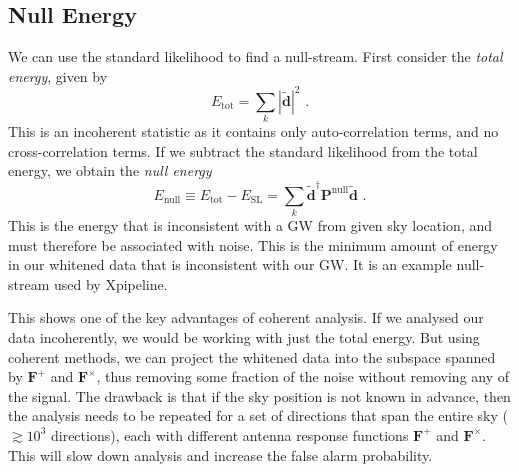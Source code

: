 \documentclass[12pt,twoside,a4paper]{report}
\newcommand{\fs}{\text{ .}}
\newcommand{\tbd}{\tilde{\textbf{d}}}
\begin{document}
\subsection{Null Energy}
We can use the standard likelihood to find a null-stream. First consider the \emph{total energy}, given by
\begin{equation}
E_\text{tot}=\sum_k | \tbd |^2 \fs
\end{equation}
This is an incoherent statistic as it contains only auto-correlation terms, and no cross-correlation terms. If we subtract the standard likelihood from the total energy, we obtain the \emph{null energy}
\begin{equation} \label{Enull}
E_\text{null} \equiv E_\text{tot}-E_\text{SL}=\sum_k \tbd ^\dagger \textbf{P}^\text{null} \tbd \fs
\end{equation}
This is the energy that is inconsistent with a GW from given sky location, and must therefore be associated with noise. This is the minimum amount of energy in our whitened data that is inconsistent with our GW. It is an example null-stream used by Xpipeline.

This shows one of the key advantages of coherent analysis. If we analysed our data incoherently, we would be working with just the total energy. But using coherent methods, we can project the whitened data into the subspace spanned by $\textbf{F}^+$ and $\textbf{F}^\times$, thus removing some fraction of the noise without removing any of the signal. The drawback is that if the sky position is not known in advance, then the analysis needs to be repeated for a set of directions that span the entire sky ($\gtrsim 10^3$ directions), each with different antenna response functions $\textbf{F}^+$ and $\textbf{F}^\times$. This will slow down analysis and increase the false alarm probability.
\end{document}
